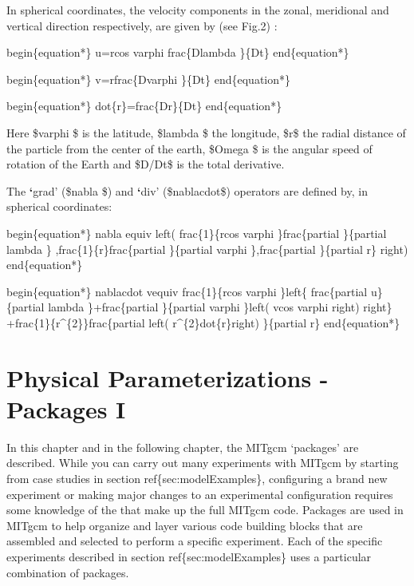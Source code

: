 \documentclass[letterpaper,10pt,english]{sphinxmanual}
\begin{document}
In spherical coordinates, the velocity components in the zonal, meridional
and vertical direction respectively, are given by (see Fig.2) :

begin\{equation*\}
u=rcos varphi frac\{Dlambda \}\{Dt\}
end\{equation*\}

begin\{equation*\}
v=rfrac\{Dvarphi \}\{Dt\}
end\{equation*\}

begin\{equation*\}
dot\{r\}=frac\{Dr\}\{Dt\}
end\{equation*\}

Here \$varphi \$ is the latitude, \$lambda \$ the longitude, \$r\$ the radial
distance of the particle from the center of the earth, \$Omega \$ is the
angular speed of rotation of the Earth and \$D/Dt\$ is the total derivative.

The {\color{red}\bfseries{}{}`}grad' (\$nabla \$) and {\color{red}\bfseries{}{}`}div' (\$nablacdot\$) operators are defined by, in
spherical coordinates:

begin\{equation*\}
nabla equiv left( frac\{1\}\{rcos varphi \}frac\{partial \}\{partial lambda \}
,frac\{1\}\{r\}frac\{partial \}\{partial varphi \},frac\{partial \}\{partial r\}
right)
end\{equation*\}

begin\{equation*\}
nablacdot vequiv frac\{1\}\{rcos varphi \}left\{ frac\{partial u\}\{partial
lambda \}+frac\{partial \}\{partial varphi \}left( vcos varphi right) right\}
+frac\{1\}\{r\textasciicircum{}\{2\}\}frac\{partial left( r\textasciicircum{}\{2\}dot\{r\}right) \}\{partial r\}
end\{equation*\}


\chapter{Physical Parameterizations - Packages I}
\label{\detokenize{phys_pkgs/phys_pkgs:packagesi}}\label{\detokenize{phys_pkgs/phys_pkgs:physical-parameterizations-packages-i}}\label{\detokenize{phys_pkgs/phys_pkgs::doc}}
In this chapter and in the following chapter, the MITgcm `packages' are
described. While you can carry out many experiments with MITgcm by starting
from case studies in section ref\{sec:modelExamples\}, configuring
a brand new experiment or making major changes to an experimental configuration
requires some knowledge of the 
that make up the full MITgcm code. Packages are used in MITgcm to
help organize and layer various code building blocks that are assembled
and selected to perform a specific experiment. Each of the specific experiments
described in section ref\{sec:modelExamples\} uses a particular combination
of packages.
\end{document}
